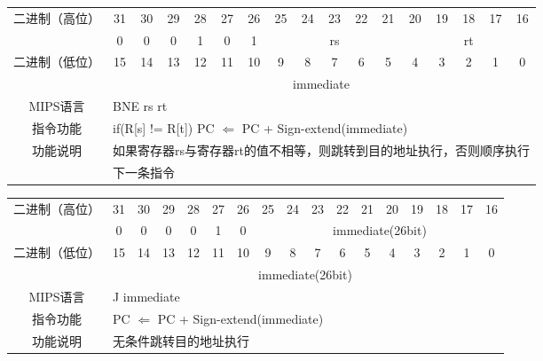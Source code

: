 \begin{table}
\begin{tabular}{|c|c|c|c|c|c|c|c|c|c|c|c|c|c|c|c|c|}
\hline
\multirow{2}{*}{二进制（高位）} &
31&30&29&28&27&26&25&24&23&22&21&20&19&18&17&16\\
\cline{2-17}
&
0&0&0&1&0&
1&
\multicolumn{5}{c|}{rs}&
\multicolumn{5}{c|}{rt}\\
\hline
\multirow{2}{*}{二进制（低位）} &
15&14&13&12&11&10&9&8&7&6&5&4&3&2&1&0\\
\cline{2-17}
&
\multicolumn{16}{c|}{immediate}\\
\hline
MIPS语言&
\multicolumn{16}{l|}{BNE rs rt}\\
\hline
指令功能&
\multicolumn{16}{l|}{if(R[s] != R[t]) PC $\Leftarrow$ PC + Sign-extend(immediate)}\\
\hline
\multirow{2}{*}{功能说明}&
\multicolumn{16}{l|}{如果寄存器rs与寄存器rt的值不相等，则跳转到目的地址执行，否则顺序执行}\\
&\multicolumn{16}{l|}{下一条指令}\\
\hline
\end{tabular}
\end{table}

\begin{table}
\begin{tabular}{|c|c|c|c|c|c|c|c|c|c|c|c|c|c|c|c|c|}
\hline
\multirow{2}{*}{二进制（高位）} &
31&30&29&28&27&26&25&24&23&22&21&20&19&18&17&16\\
\cline{2-17}
&
0&0&0&0&1&
0&
\multicolumn{10}{c|}{immediate(26bit)}\\
\hline
\multirow{2}{*}{二进制（低位）} &
15&14&13&12&11&10&9&8&7&6&5&4&3&2&1&0\\
\cline{2-17}
&
\multicolumn{16}{c|}{immediate(26bit)}\\
\hline
MIPS语言&
\multicolumn{16}{l|}{J immediate}\\
\hline
指令功能&
\multicolumn{16}{l|}{PC $\Leftarrow$ PC + Sign-extend(immediate)}\\
\hline
功能说明&
\multicolumn{16}{l|}{无条件跳转目的地址执行}\\
\hline
\end{tabular}
\end{table}

